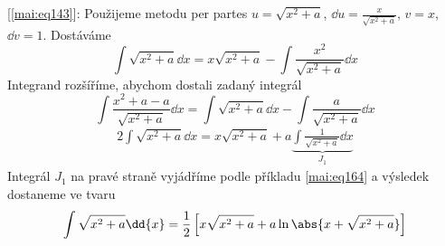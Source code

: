   [\ref{mai:eq143}]: Použijeme metodu per partes \(u =\sqrt{x^2+a}\), \(\dd{u} =
  \frac{x}{\sqrt{x^2+a}}\), \(v = x\), \(\dd{v} = 1\).  Dostáváme
  \begin{equation*}
    \int{\sqrt{x^2+a}\dd{x}} = x\sqrt{x^2+a}-\int{\frac{x^2}{\sqrt{x^2+a}}\dd{x}}
  \end{equation*}
  Integrand rozšíříme, abychom dostali zadaný integrál 
  \begin{equation*}
      \int\frac{x^2+a-a}{\sqrt{x^2+a}}\dd{x} 
        = \int{\sqrt{x^2+a}\dd{x}} - \int{\frac{a}{\sqrt{x^2+a}}\dd{x}}                   
  \end{equation*}
  \begin{align*}
    2\!\int{\sqrt{x^2+a}\dd{x}} 
      = x\sqrt{x^2+a}+a\underbrace{\int{\frac{1}{\sqrt{x^2+a}}}\dd{x}}_{J_1}
  \end{align*}    
  Integrál \(J_1\) na pravé straně vyjádříme podle příkladu \ref{mai:eq164} a výsledek
  dostaneme ve tvaru
  \begin{gather*}
    \int\sqrt{x^2+a}\dd{x}
        =\frac{1}{2}\left[x\sqrt{x^2+a}+a\ln{\abs{x + \sqrt{x^2+a}}}\right]
  \end{gather*}